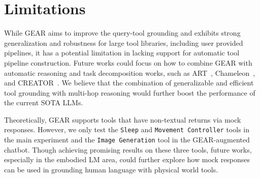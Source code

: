 \documentclass[11pt]{article}
\newcommand{\llm}{\textcolor{darkredTwo}{LLM}}
\newcommand{\name}{{\fontfamily{cmss}\selectfont GEAR}}
\newcommand{\sleep}{{\tt Sleep}}
\newcommand{\map}{{\tt Movement Controller}}
\newcommand{\image}{{\tt Image Generation}}
\begin{document}
\section*{Limitations}
While \name{} aims to improve the query-tool grounding and exhibits strong generalization and robustness for large tool libraries, including user provided pipelines, it has a potential limitation in lacking support for automatic tool pipeline construction. Future works could focus on how to combine \name{} with automatic reasoning and task decomposition works, such as ART~\citep{paranjape2023art}, Chameleon~\cite{lu2023chameleon}, and CREATOR~\citep{qian2023creator}. We believe that the combination of generalizable and efficient tool grounding with multi-hop reasoning would further boost the performance of the current SOTA \llm{}s.  

Theoretically, \name{} supports tools that have non-textual returns via mock responses. However, we only test the \sleep{} and \map{} tools in the main experiment and the \image{} tool in the \name{}-augmented chatbot. Though achieving promising results on these three tools, future works, especially in the embodied LM area, could further explore how mock responses can be used in grounding human language with physical world tools.



\end{document}
